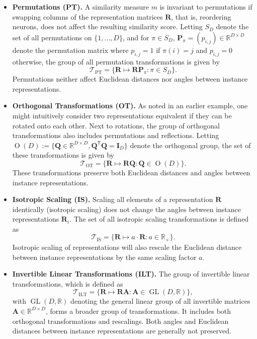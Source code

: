 \documentclass{article}
\newcommand{\Real}{\mathbb{R}}
\newcommand{\R}{\bm{R}}
\newcommand{\transp}{\mathsf{T}}
\begin{document}
\begin{itemize}
    \item \textbf{Permutations (PT).}
    A similarity measure $m$ is invariant to permutations if swapping columns of the representation matrices $\R$, that is, reordering neurons, does not affect the resulting similarity score. Letting $S_D$ denote the set of all permutations on $\{1,\dots,D\}$, and for $\pi\in S_D$, $\bm{P}_\pi = (p_{i,j})\in\Real^{D\times D}$ denote the permutation matrix where $p_{i,j}=1$ if $\pi(i)=j$ and $p_{i,j}=0$ otherwise, the group of all permutation transformations is given by
    \begin{equation}
     \mathcal{T}_\text{PT} = \{\R\mapsto \R \bm{P}_\pi: \pi\in S_D\}.
    \end{equation}
    Permutations neither affect Euclidean distances nor angles between instance representations.

    \item \textbf{Orthogonal Transformations (OT).}
    As noted in an earlier example, one might intuitively consider two representations equivalent if they can be rotated onto each other.
    Next to rotations, the group of orthogonal transformations also includes permutations and reflections.
    Letting $\operatorname{O}(D) := \{\bm{Q} \in\Real^{D\times D}, \bm{Q}^{\transp} \bm{Q} = \bm{I}_D\}$ denote the orthogonal group, the set of these transformations is given by
    \begin{equation}
    \mathcal{T}_\text{OT} = \{\R\mapsto \R \bm{Q}: \bm{Q} \in\operatorname{O}(D)\}.
    \end{equation}
    These transformations preserve both Euclidean distances and angles between instance representations.

    \item \textbf{Isotropic Scaling (IS).} Scaling all elements of a representation $\R$ identically (isotropic scaling) does not change the angles between instance representations $\R_i$.
    The set of all isotropic scaling transformations is defined as
    \begin{equation}
     \mathcal{T}_\text{IS} = \{\R\mapsto a\cdot \R: a\in\Real_+\}.
    \end{equation}
    Isotropic scaling of representations will also rescale the Euclidean distance between instance representations by the same scaling factor $a$.

    \item \textbf{Invertible Linear Transformations (ILT).}
    The group of invertible linear transformations, which is defined as
    \begin{equation}
     \mathcal{T}_\text{ILT} = \{\R\mapsto \R\bm{A}: \bm{A}\in\operatorname{GL}(D,\Real)\},
    \end{equation}
    with $\operatorname{GL}(D,\Real)$ denoting the general linear group of all invertible matrices $\bm{A}\in\Real^{D\times D}$, forms a broader group of transformations.
    It includes both orthogonal transformations and rescalings.
    Both angles and Euclidean distances between instance representations are generally not preserved.


\end{itemize}
\end{document}

